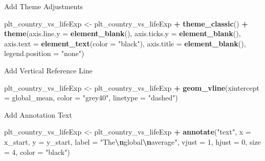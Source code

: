 \documentclass[
  ignorenonframetext,
]{beamer}
\newenvironment{Shaded}{\begin{snugshade}}{\end{snugshade}}
\newcommand{\AttributeTok}[1]{\textcolor[rgb]{0.13,0.29,0.53}{#1}}
\newcommand{\DecValTok}[1]{\textcolor[rgb]{0.00,0.00,0.81}{#1}}
\newcommand{\FunctionTok}[1]{\textcolor[rgb]{0.13,0.29,0.53}{\textbf{#1}}}
\newcommand{\NormalTok}[1]{#1}
\newcommand{\OtherTok}[1]{\textcolor[rgb]{0.56,0.35,0.01}{#1}}
\newcommand{\SpecialCharTok}[1]{\textcolor[rgb]{0.81,0.36,0.00}{\textbf{#1}}}
\newcommand{\StringTok}[1]{\textcolor[rgb]{0.31,0.60,0.02}{#1}}
\begin{document}
\begin{frame}[fragile]{Add Theme Adjustments}
\label{add-theme-adjustments}

\begin{Shaded}
\begin{Highlighting}[]
\NormalTok{plt\_country\_vs\_lifeExp }\OtherTok{\textless{}{-}}\NormalTok{ plt\_country\_vs\_lifeExp }\SpecialCharTok{+} \FunctionTok{theme\_classic}\NormalTok{() }\SpecialCharTok{+}
    \FunctionTok{theme}\NormalTok{(}\AttributeTok{axis.line.y =} \FunctionTok{element\_blank}\NormalTok{(), }\AttributeTok{axis.ticks.y =} \FunctionTok{element\_blank}\NormalTok{(),}
        \AttributeTok{axis.text =} \FunctionTok{element\_text}\NormalTok{(}\AttributeTok{color =} \StringTok{"black"}\NormalTok{), }\AttributeTok{axis.title =} \FunctionTok{element\_blank}\NormalTok{(),}
        \AttributeTok{legend.position =} \StringTok{"none"}\NormalTok{)}
\end{Highlighting}
\end{Shaded}
\end{frame}

\begin{frame}[fragile]{Add Vertical Reference Line}
\label{add-vertical-reference-line}

\begin{Shaded}
\begin{Highlighting}[]
\NormalTok{plt\_country\_vs\_lifeExp }\OtherTok{\textless{}{-}}\NormalTok{ plt\_country\_vs\_lifeExp }\SpecialCharTok{+} \FunctionTok{geom\_vline}\NormalTok{(}\AttributeTok{xintercept =}\NormalTok{ global\_mean,}
    \AttributeTok{color =} \StringTok{"grey40"}\NormalTok{, }\AttributeTok{linetype =} \StringTok{"dashed"}\NormalTok{)}
\end{Highlighting}
\end{Shaded}
\end{frame}

\begin{frame}[fragile]{Add Annotation Text}
\label{add-annotation-text}

\begin{Shaded}
\begin{Highlighting}[]
\NormalTok{plt\_country\_vs\_lifeExp }\OtherTok{\textless{}{-}}\NormalTok{ plt\_country\_vs\_lifeExp }\SpecialCharTok{+} \FunctionTok{annotate}\NormalTok{(}\StringTok{"text"}\NormalTok{,}
    \AttributeTok{x =}\NormalTok{ x\_start, }\AttributeTok{y =}\NormalTok{ y\_start, }\AttributeTok{label =} \StringTok{"The}\SpecialCharTok{\textbackslash{}n}\StringTok{global}\SpecialCharTok{\textbackslash{}n}\StringTok{average"}\NormalTok{,}
    \AttributeTok{vjust =} \DecValTok{1}\NormalTok{, }\AttributeTok{hjust =} \DecValTok{0}\NormalTok{, }\AttributeTok{size =} \DecValTok{4}\NormalTok{, }\AttributeTok{color =} \StringTok{"black"}\NormalTok{)}
\end{Highlighting}
\end{Shaded}
\end{frame}
\end{document}
